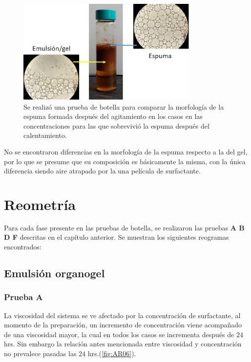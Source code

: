 \begin{figure}[H]\centering 
    \includegraphics[width=0.8\textwidth]{Experimental/comparativa.png}
    \caption[Morfología de espuma]{Se realizó una prueba de botella para comparar la morfología de la espuma formada después del agitamiento en los casos en las concentraciones para las que sobrevivió la espuma después del calentamiento. }
    \label{fig:comparativa}
\end{figure}

No se encontraron diferencias en la morfología de la espuma respecto a la del gel, por lo que se presume que su composición es básicamente la misma, con la única diferencia siendo aire atrapado por la una película de surfactante.

\section{Reometría}
Para cada fase presente en las pruebas de botella, se realizaron las pruebas \textbf{A B D F} descritas en el capítulo anterior. Se muestran los siguientes reogramas encontrados:

\subsection{Emulsión organogel}

    \subsubsection{Prueba A}
    La viscosidad del sistema se ve afectado por la concentración de surfactante, al momento de la preparación, un incremento de concentración viene acompañado de una viscosidad mayor, la cual en todos los casos se incrementa después de $24$ hrs. Sin embargo la relación antes mencionada entre viscosidad y concentración no prevalece pasadas las $24$ hrs.(\autoref{fig:AR06}).
    
